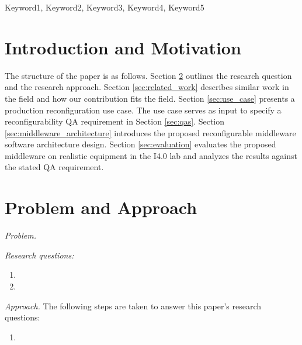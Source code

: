 \documentclass[conference]{IEEEtran}
\begin{document}
\maketitle
\IEEEpubidadjcol
\begin{abstract}

    



\end{abstract}

\begin{IEEEkeywords}
Keyword1, Keyword2, Keyword3, Keyword4, Keyword5
\end{IEEEkeywords}

\section{Introduction and Motivation}

The structure of the paper is as follows. 
Section \ref{sec:problem} outlines the research question and the research approach. 
Section \ref{sec:related_work} describes similar work in the field and how our contribution fits the field.
Section \ref{sec:use_case} presents a production reconfiguration use case.
The use case serves as input to specify a reconfigurability QA requirement in Section \ref{sec:qas}.
Section \ref{sec:middleware_architecture} introduces the proposed reconfigurable middleware software architecture design.
Section \ref{sec:evaluation} evaluates the proposed middleware on realistic equipment in the I4.0 lab and analyzes the results against the stated QA requirement.   

\section{Problem and Approach}

\label{sec:problem}
\emph{Problem.}

\emph{Research questions:}
\begin{enumerate}
    \item  
    \item 
\end{enumerate}

\emph{Approach.}
The following steps are taken to answer this paper's research questions: 
\begin{enumerate}
    \item 
\end{enumerate}
\end{document}
